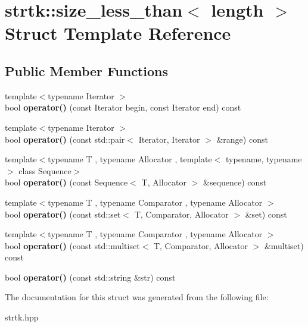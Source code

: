 \hypertarget{structstrtk_1_1size__less__than}{\section{strtk\-:\-:size\-\_\-less\-\_\-than$<$ length $>$ Struct Template Reference}
\label{structstrtk_1_1size__less__than}
}
\subsection*{Public Member Functions}
\begin{DoxyCompactItemize}
\item 
\hypertarget{structstrtk_1_1size__less__than_ab38b2cd1c4c77fe66a382ff5ce00e03d}{{\footnotesize template$<$typename Iterator $>$ }\\bool {\bfseries operator()} (const Iterator begin, const Iterator end) const }\label{structstrtk_1_1size__less__than_ab38b2cd1c4c77fe66a382ff5ce00e03d}

\item 
\hypertarget{structstrtk_1_1size__less__than_a452b71718d37d5ca0602daf3867f5bb6}{{\footnotesize template$<$typename Iterator $>$ }\\bool {\bfseries operator()} (const std\-::pair$<$ Iterator, Iterator $>$ \&range) const }\label{structstrtk_1_1size__less__than_a452b71718d37d5ca0602daf3867f5bb6}

\item 
\hypertarget{structstrtk_1_1size__less__than_a566a9d084f1b76d7ed63adf6820238f0}{{\footnotesize template$<$typename T , typename Allocator , template$<$ typename, typename $>$ class Sequence$>$ }\\bool {\bfseries operator()} (const Sequence$<$ T, Allocator $>$ \&sequence) const }\label{structstrtk_1_1size__less__than_a566a9d084f1b76d7ed63adf6820238f0}

\item 
\hypertarget{structstrtk_1_1size__less__than_a077d997166d52510e3feba72d3bd4587}{{\footnotesize template$<$typename T , typename Comparator , typename Allocator $>$ }\\bool {\bfseries operator()} (const std\-::set$<$ T, Comparator, Allocator $>$ \&set) const }\label{structstrtk_1_1size__less__than_a077d997166d52510e3feba72d3bd4587}

\item 
\hypertarget{structstrtk_1_1size__less__than_a407bf4991785e4f4f3da6a0feebb58a4}{{\footnotesize template$<$typename T , typename Comparator , typename Allocator $>$ }\\bool {\bfseries operator()} (const std\-::multiset$<$ T, Comparator, Allocator $>$ \&multiset) const }\label{structstrtk_1_1size__less__than_a407bf4991785e4f4f3da6a0feebb58a4}

\item 
\hypertarget{structstrtk_1_1size__less__than_a5c831d9472a1a0f441ca71fc813c139d}{bool {\bfseries operator()} (const std\-::string \&str) const }\label{structstrtk_1_1size__less__than_a5c831d9472a1a0f441ca71fc813c139d}

\end{DoxyCompactItemize}


The documentation for this struct was generated from the following file\-:\begin{DoxyCompactItemize}
\item 
strtk.\-hpp\end{DoxyCompactItemize}
